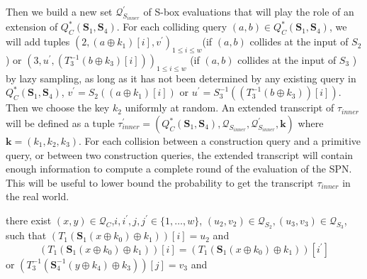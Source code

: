 Then we build a new set $\mathcal{Q}_{S_{inner}}^{\prime}$ of S-box evaluations that will play the role of an extension of $Q_{C}^{*}\left(\mathbf{S}_{1},\mathbf{S}_{4}\right)$. For each colliding query $(a, b) \in Q_{C}^{*}\left(\mathbf{S}_{1},\mathbf{S}_{4}\right)$, we will add tuples $\left(2, \left(a \oplus k_{1}\right)[i], v^{\prime}\right)_{1 \leq i \leq w}$(if $(a,b)$ collides at the input of $S_2$ ) or $\left(3, u^{\prime}, \left(T_{3}^{-1}\left(b \oplus k_{3}\right)[i]\right)\right)_{1 \leq i \leq w}$ (if $(a,b)$ collides at the input of $S_3$ ) by lazy sampling, as long as it has not been determined by any existing query in $Q_{C}^{*}\left(\mathbf{S}_{1},\mathbf{S}_{4}\right)$, $v^{\prime}=S_{2}(\left(a \oplus k_{1}\right)[i])$ or $u^{\prime}=S_{3}^{-1}(\left(T_{3}^{-1}\left(b \oplus k_{3}\right) \right)[i])$. Then we choose the key $k_2$ uniformly at random. An extended transcript of $\tau_{inner}$ will be defined as a tuple $\tau_{inner}^{\prime}=\left(Q_{C}^{*}\left(\mathbf{S}_{1},\mathbf{S}_{4}\right), \mathcal{Q}_{S_{inner}}, \mathcal{Q}_{S_{inner}}^{\prime}, \mathbf{k}\right)$ where $\mathbf{k}=\left(k_{1}, k_{2},k_{3}\right)$. For each collision between a construction query and a primitive query, or between two construction queries, the extended transcript will contain enough information to compute a complete round of the evaluation of the SPN. This will be useful to lower bound the probability to get the transcript $\tau_{inner}$ in the real world.\\






\item[(B-4)]
  there exist $(x, y) \in \mathcal{Q}_{C}$,$i,i^{\prime},j,j^{\prime} \in\{1, \ldots, w\}$, $\left(u_{2}, v_{2}\right) \in \mathcal{Q}_{S_{2}},\left(u_{3}, v_{3}\right) \in \mathcal{Q}_{S_{3}}$, such that $\left(T_{1}\left(\mathbf{S}_{1}\left(x \oplus k_{0}\right) \oplus k_{1}\right)\right)[i]=u_2$ and $$\left(T_{1}\left(\mathbf{S}_{1}\left(x \oplus k_{0}\right) \oplus k_{1}\right)\right)[i] = \left(T_{1}\left(\mathbf{S}_{1}\left(x \oplus k_{0}\right) \oplus k_{1}\right)\right)[i^{\prime}]$$ or $\left(T_{3}^{-1}\left(\mathbf{S}_{4}^{-1}\left(y \oplus k_{4}\right) \oplus k_{3}\right)\right)[j]=v_3$ and

